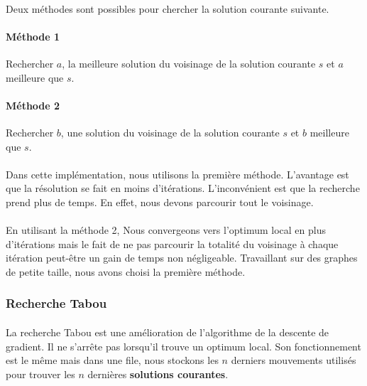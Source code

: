 \documentclass[12pt]{article}
\begin{document}
\paragraph{}Deux méthodes sont possibles pour chercher la solution courante suivante.

\paragraph{Méthode 1}Rechercher $a$, la meilleure solution du voisinage de la solution courante $s$ et $a$ meilleure que $s$.

\paragraph{Méthode 2}Rechercher $b$, une solution du voisinage de la solution courante $s$ et $b$ meilleure que $s$.

\paragraph{}Dans cette implémentation, nous utilisons la première méthode.
L'avantage est que la résolution se fait en moins d'itérations. L'inconvénient est que la recherche prend plus de temps. En effet, nous devons parcourir tout le voisinage.

\paragraph{}En utilisant la méthode 2,
Nous convergeons vers l'optimum local en plus d'itérations mais le fait de ne pas parcourir la totalité du voisinage à chaque itération peut-être un gain de temps non négligeable.
Travaillant sur des graphes de petite taille, nous avons choisi la première méthode.

\subsubsection{Recherche Tabou}

\paragraph{}La recherche Tabou est une amélioration de l'algorithme de la descente de gradient. Il ne s'arrête pas lorsqu'il trouve un optimum local.
Son fonctionnement est le même mais dans une file, nous stockons les $n$ derniers mouvements utilisés pour trouver les $n$ dernières \textbf{solutions courantes}.
\end{document}
